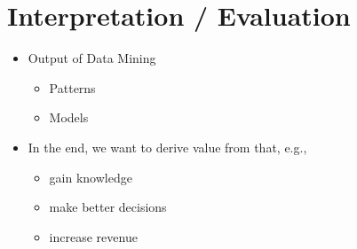\chapter{Interpretation / Evaluation}
\begin{itemize}
	\item Output of Data Mining
	\begin{itemize}
		\item Patterns
		\item Models
	\end{itemize}
	\item In the end, we want to derive value from that, e.g.,
	\begin{itemize}
		\item gain knowledge
		\item make better decisions
		\item increase revenue
	\end{itemize}
\end{itemize}



